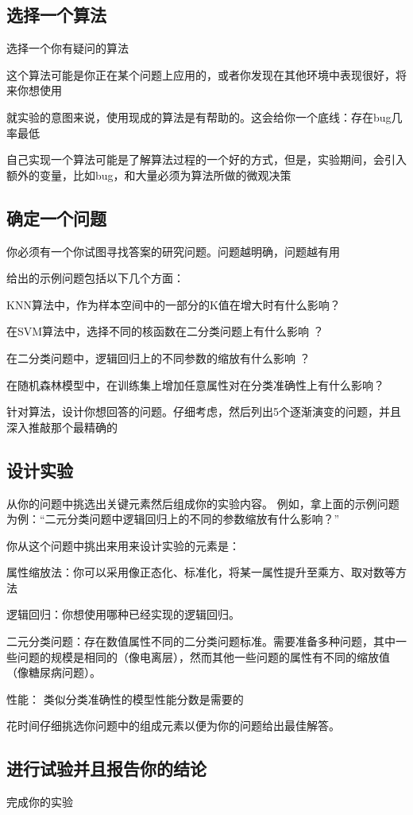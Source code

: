 \documentclass[a4paper,12pt]{ctexbook}
\begin{document}
\subsection{选择一个算法}
选择一个你有疑问的算法

这个算法可能是你正在某个问题上应用的，或者你发现在其他环境中表现很好，将来你想使用

就实验的意图来说，使用现成的算法是有帮助的。这会给你一个底线：存在bug几率最低

自己实现一个算法可能是了解算法过程的一个好的方式，但是，实验期间，会引入额外的变量，比如bug，和大量必须为算法所做的微观决策
\subsection{确定一个问题}
你必须有一个你试图寻找答案的研究问题。问题越明确，问题越有用

给出的示例问题包括以下几个方面：

KNN算法中，作为样本空间中的一部分的K值在增大时有什么影响？

在SVM算法中，选择不同的核函数在二分类问题上有什么影响 ？

在二分类问题中，逻辑回归上的不同参数的缩放有什么影响 ？

在随机森林模型中，在训练集上增加任意属性对在分类准确性上有什么影响？

针对算法，设计你想回答的问题。仔细考虑，然后列出5个逐渐演变的问题，并且深入推敲那个最精确的
\subsection{设计实验}
从你的问题中挑选出关键元素然后组成你的实验内容。 例如，拿上面的示例问题为例：“二元分类问题中逻辑回归上的不同的参数缩放有什么影响？”

你从这个问题中挑出来用来设计实验的元素是：

属性缩放法：你可以采用像正态化、标准化，将某一属性提升至乘方、取对数等方法

逻辑回归：你想使用哪种已经实现的逻辑回归。

二元分类问题：存在数值属性不同的二分类问题标准。需要准备多种问题，其中一些问题的规模是相同的（像电离层），然而其他一些问题的属性有不同的缩放值（像糖尿病问题）。

性能： 类似分类准确性的模型性能分数是需要的

花时间仔细挑选你问题中的组成元素以便为你的问题给出最佳解答。
\subsection{进行试验并且报告你的结论}
完成你的实验
\end{document}
